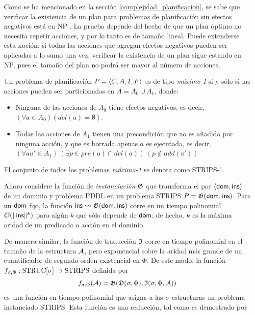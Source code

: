 Como se ha mencionado en la sección \ref{complejidad_planificacion}, 
se sabe que verificar la existencia de un plan para 
problemas de planificación
sin efectos negativos está en NP \citep{bylander:plan-complexity}. La prueba
depende del hecho de que un plan óptimo no necesita repetir acciones, y por lo
tanto es de tamaño lineal. Puede extenderse esta noción: si todas las acciones que
agregan efectos negativos pueden ser aplicadas a lo sumo una vez, verificar la
existencia de un plan sigue estando en NP, pues el tamaño del plan no podrá ser
mayor al número de acciones.

\begin{definition}
Un problema de planificación $P = \langle C, A, I, F \rangle$ es de tipo
\textit{máximo-1} si y sólo si las acciones pueden ser particionadas en $A =
A_0 \cup A_1$, donde:
\begin{itemize}
\item Ninguna de las acciones de $A_0$ tiene efectos negativos, es decir,
$(\forall a \in A_0) (del(a) = \emptyset)$.
\item Todas las acciones de $A_1$ tienen una precondición que no es añadida por
ninguna acción, y que es borrada apenas $a$ es ejecutada, es decir, 
$(\forall aa' \in A_1)\ (\exists p \in pre(a) \cap del(a))\ (p \not\in add(a'))$
\end{itemize}

El conjunto de todos los problemas \textit{máximo-1} se denota como STRIPS-1.
\end{definition}

Ahora considere la función de \emph{instanciación} $\mathfrak{G}$ que transforma el par
$\langle \mathsf{dom},\mathsf{ins} \rangle$ de un dominio y problema PDDL en un problema STRIPS
$P = \mathfrak{G}(\mathsf{dom}, \mathsf{ins})$. Para un $\mathsf{dom}$ fijo, la función
$\mathsf{ins}\leadsto\mathfrak{G}(\mathsf{dom}, \mathsf{ins})$ corre en un tiempo polinomial
$\mathcal{O}(\|\mathsf{ins}\|^k)$ para algún $k$ que sólo depende de $\mathsf{dom}$; de hecho,
$k$ es la máxima aridad de un predicado o acción en el dominio.

De manera similar, la función de traducción $\mathfrak{I}$ corre en tiempo
polinomial en el tamaño de la estructura $\mathcal{A}$, pero exponencial sobre la aridad
más grande de un cuantificador de segundo orden existencial en $\Phi$. De este
modo, la función $f_{\sigma,\Phi}:\text{STRUC}[\sigma]\rightarrow\text{STRIPS}$
definida por 
\[ f_{\sigma,\Phi}(\mathcal{A}) = \mathfrak{G}(\mathfrak{D}(\sigma,\Phi),\mathfrak{I}(\sigma,\Phi,\mathcal{A})) \]
es una función en tiempo polinomial que asigna a las $\sigma$-estructuras un
problema instanciado STRIPS. Esta función es una reducción, tal como es
demostrado por

